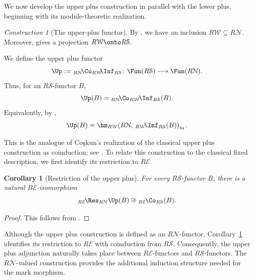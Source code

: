 \documentclass{amsart}
\numberwithin{equation}{section}%
\newtheorem{Cor}[equation]{Corollary}
\theoremstyle{remark}
\newtheorem{Cons}[equation]{Construction}
\theoremstyle{definition}
\newcommand{\e}{\mathcal E}
\newcommand{\s}{\mathcal S}
\newcommand{\n}{\mathcal N}
\newcommand{\w}{\mathcal W}
\newcommand{\lRes}[1]{{}_{#1}\!\Res}
\newcommand{\lInf}[1]{{}_{#1}\!\Inf}
\newcommand{\lCo}[1]{{}_{#1}\!\Co}
\newcommand{\iInf}[2]{{}_{#1}\!\Inf_{#2}}
\newcommand{\iCo}[2]{{}_{#1}\!\Co_{#2}}
\begin{document}
We now develop the upper plus construction in parallel with the lower
plus, beginning with its module-theoretic realization.
%
\begin{Cons}[The upper-plus functor]
\label{con:upper-plus}
By , we have an inclusion
$R\w\subseteq R\n$.  Moreover,
 gives a projection
$R\w\onto R\s$.

We define the upper plus functor
%
\[
\Up
:=
\iCo{R\n}{R\w}\!\iInf{}{R\s}
\colon
\Fun(R\s)\longrightarrow\Fun(R\n).
\]
%
Thus, for an $R\s$-functor $B$,
%
\[
\Up(B)
=
\iCo{R\n}{R\w}
\iInf{}{R\s}(B).
\]
%
Equivalently, by
,
%
\[
\Up(B)
=
\hm_{R\w}\!
\left(
R\n,\,
\lInf{R\w}_{R\s}(B)
\right)_{\mathrm{lu}}.
\]
%
\end{Cons}
%
This is the analogue of Coşkun's realization of the classical
upper plus construction as coinduction; see
\cite[Theorem~5.2]{Coskun07}.
%
To relate this construction to the classical fixed description, we
first identify its restriction to $R\e$.
%
\begin{Cor}[Restriction of the upper plus]
\label{cor:upper-plus-restriction-comparison}
For every $R\s$-functor $B$, there is a natural
$R\e$-isomorphism
%
\[\lRes{R\e}_{R\n}\Up(B)
\cong
\lCo{R\e}_{R\s}(B).
\]
\end{Cor}
%
\begin{proof}
This follows from
.
\end{proof}
%

Although the upper plus construction is defined as an
$R\mathcal N$-functor, Corollary~\ref{cor:upper-plus-restriction-comparison}
identifies its restriction to $R\mathcal E$ with coinduction
from $R\mathcal S$. Consequently, the upper plus adjunction
naturally takes place between $R\mathcal E$-functors and
$R\mathcal S$-functors. The $R\mathcal N$-valued construction
provides the additional induction structure needed for the
mark morphism.
%
\end{document}
